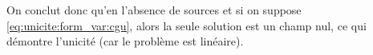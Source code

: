   On conclut donc qu'en l'absence de sources et si on suppose \eqref{eq:unicite:form_var:cgu}, alors la seule solution est un champ nul, ce qui démontre l'unicité (car le problème est linéaire).




